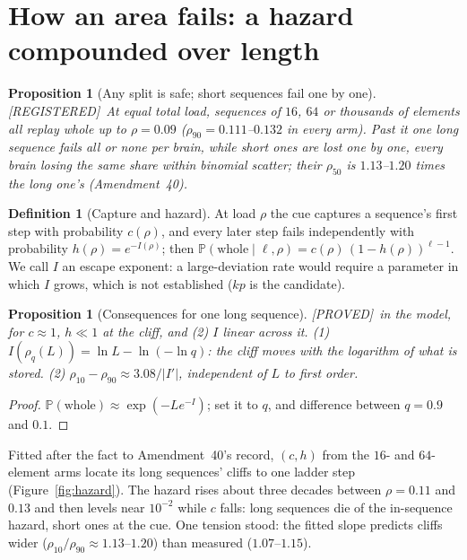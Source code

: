\documentclass[11pt]{article}
\theoremstyle{definition}
\newtheorem{definition}{Definition}
\theoremstyle{plain}
\newtheorem{proposition}[lemma]{Proposition}
\newcommand{\REG}{\textnormal{\footnotesize\textsf{[REGISTERED]}}}
\newcommand{\PROVED}{\textnormal{\footnotesize\textsf{[PROVED]}}}
\newcommand{\Prob}{\mathbb{P}}
\begin{document}
\section{How an area fails: a hazard compounded over length}\label{sec:hazard}

\begin{proposition}[Any split is safe; short sequences fail one by one]\label{prop:split}
\REG\ At equal total load, sequences of $16$, $64$ or thousands of elements all
replay whole up to $\rho = 0.09$ ($\rho_{90} = 0.111$--$0.132$ in every arm). Past
it one long sequence fails all or none per brain, while short ones are lost
one by one, every brain losing the same share within binomial scatter;
their $\rho_{50}$ is $1.13$--$1.20$ times the long one's (Amendment~40).
\end{proposition}

\begin{definition}[Capture and hazard]
At load $\rho$ the cue captures a sequence's first step with probability
$c(\rho)$, and every later step fails independently with probability
$h(\rho) = e^{-I(\rho)}$; then $\Prob(\text{whole}\mid\ell,\rho) =
c(\rho)\,(1-h(\rho))^{\ell-1}$. We call $I$ an escape exponent: a large-deviation
rate would require a parameter in which $I$ grows, which is not established
($kp$ is the candidate).
\end{definition}

\begin{proposition}[Consequences for one long sequence]\label{prop:ld}
\PROVED\ in the model, for $c\approx 1$, $h \ll 1$ at the cliff, and (2) $I$
linear across it. (1) $I(\rho_q(L)) = \ln L - \ln(-\ln q)$: the cliff moves
with the logarithm of what is stored. (2) $\rho_{10}-\rho_{90} \approx
3.08/|I'|$, independent of $L$ to first order.
\end{proposition}
\begin{proof}
$\Prob(\text{whole}) \approx \exp(-Le^{-I})$; set it to $q$, and difference
between $q = 0.9$ and $0.1$.
\end{proof}

Fitted after the fact to Amendment~40's record, $(c,h)$ from the $16$- and
$64$-element arms locate its long sequences' cliffs to one ladder step
(Figure~\ref{fig:hazard}). The hazard rises about three decades between
$\rho = 0.11$ and $0.13$ and then levels near $10^{-2}$ while $c$ falls: long
sequences die of the in-sequence hazard, short ones at the cue. One tension
stood: the fitted slope predicts cliffs wider ($\rho_{10}/\rho_{90} \approx
1.13$--$1.20$) than measured ($1.07$--$1.15$).
\end{document}
